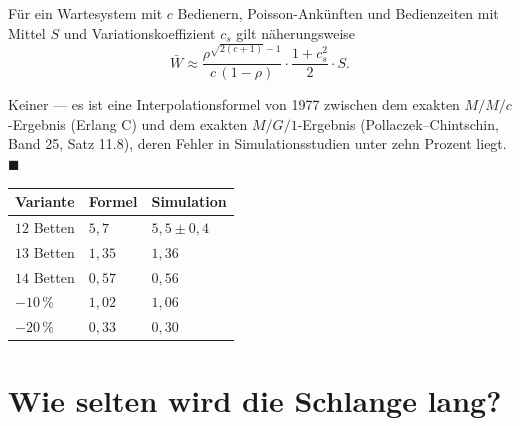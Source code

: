 \begin{merksatz}
Für ein Wartesystem mit $c$ Bedienern, Poisson-Ankünften und Bedienzeiten mit Mittel $S$ und Variationskoeffizient $c_s$ gilt näherungsweise
\[ \bar W \approx \frac{\rho^{\sqrt{2(c+1)}-1}}{c\,(1-\rho)}\cdot\frac{1+c_s^2}{2}\cdot S . \]

Keiner --- es ist eine Interpolationsformel von 1977 zwischen dem exakten $M/M/c$-Ergebnis (Erlang C) und dem exakten $M/G/1$-Ergebnis (Pollaczek--Chintschin, Band 25, Satz 11.8), deren Fehler in Simulationsstudien unter zehn Prozent liegt. $\blacksquare$

\begin{center}
{\small
\renewcommand{\arraystretch}{1.48}
\begin{tabular}{@{}P{3.0cm}P{2.2cm}P{2.2cm}@{}}
\toprule
\textbf{Variante} & \textbf{Formel} & \textbf{Simulation}\\
\midrule
$12$ Betten & $5{,}7$ & $5{,}5\pm0{,}4$\\
$13$ Betten & $1{,}35$ & $1{,}36$\\
$14$ Betten & $0{,}57$ & $0{,}56$\\
$-10\,\%$ & $1{,}02$ & $1{,}06$\\
$-20\,\%$ & $0{,}33$ & $0{,}30$\\
\bottomrule
\end{tabular}}
\end{center}

\begin{center}
\begin{minipage}{0.88\textwidth}
\end{minipage}
\end{center}
\end{merksatz}

\section{Wie selten wird die Schlange lang?}

